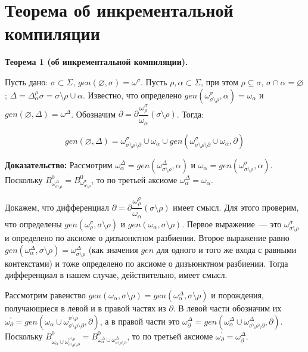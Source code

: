 %
%



\newpage
\section{Теорема об инкрементальной компиляции}

\newcommand{\butpartial}{\sigma\setminus\rho\setminus\partial}

\textbf{Теорема 1 (об инкрементальной компиляции).}

Пусть дано: $\sigma \subset \Sigma$, $gen(\varnothing, \sigma) = \omega^\sigma$. Пусть $\rho, \alpha \subset \Sigma$, при этом $\rho \subseteq \sigma$, $\sigma \cap \alpha = \varnothing$; $\Delta = \Delta^\rho_\alpha\sigma = \sigma\setminus\rho\cup\alpha$. Известно, что определено $gen(\omega^\sigma_{\sigma\setminus\rho}, \alpha) = \omega_\alpha$ и $gen(\varnothing, \Delta) = \omega^\Delta$. Обозначим $\partial = \partial\dfrac{\omega^\sigma_\rho}{\omega_\alpha}(\sigma\setminus\rho)$.
Тогда:

$$gen(\varnothing, \Delta) = \omega^\sigma_{\butpartial} \cup \omega_\alpha \cup gen(\omega^\sigma_{\butpartial} \cup \omega_\alpha, \partial)$$

\textbf{Доказательство:}
Рассмотрим $\omega^\Delta_\alpha = gen(\omega^\Delta_{\sigma\setminus\rho}, \alpha)$ и $\omega_\alpha = gen(\omega^\sigma_{\sigma\setminus\rho}, \alpha)$. Поскольку $B^0_{\omega^\Delta_{\sigma\setminus\rho}} = B^0_{\omega^\sigma_{\sigma\setminus\rho}}$, то по третьей аксиоме $\omega^\Delta_\alpha = \omega_\alpha$.

Докажем, что дифференциал $\partial = \partial\dfrac{\omega^\sigma_\rho}{\omega_\alpha}(\sigma\setminus\rho)$ имеет смысл. Для этого проверим, что определены $gen(\omega^\sigma_\rho, \sigma\setminus\rho)$ и $gen(\omega_\alpha, \sigma\setminus\rho)$. Первое выражение~--- это $\omega^\sigma_{\sigma\setminus\rho}$ и определено по аксиоме о дизъюнктном разбиении. Второе выражение равно $gen(\omega^\Delta_\alpha, \sigma\setminus\rho) = \omega^\Delta_{\sigma\setminus\rho}$ (как значения $gen$ для одного и того же входа с равными контекстами) и тоже определено по аксиоме о дизъюнктном разбиении. Тогда дифференциал в нашем случае, действительно, имеет смысл.

Рассмотрим равенство $gen(\omega_\alpha, \sigma\setminus\rho) = gen(\omega^\Delta_\alpha, \sigma\setminus\rho)$ и порождения, получающиеся в левой и в правой частях из $\partial$. В левой части обозначим их $\omega^\prime_\partial = gen(\omega_\alpha \cup \omega^{\sigma\setminus\rho}_{\butpartial}, \partial)$, а в правой части это $\omega^\Delta_\partial = gen(\omega^\Delta_\alpha \cup \omega^\Delta_{\butpartial}, \partial)$. Поскольку $B^0_{\omega_\alpha \cup \omega^{\sigma\setminus\rho}_{\butpartial}} = B^0_{\omega^\Delta_\alpha \cup \omega^\Delta_{\butpartial}}$, то по третьей аксиоме $\omega^\prime_\partial = \omega^\Delta_\partial$.

